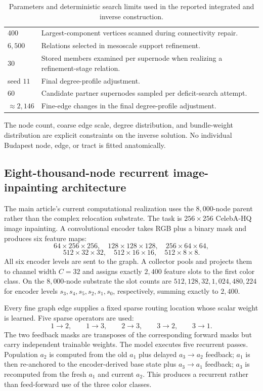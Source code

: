 \documentclass[12pt]{article}
\begin{document}
\begin{table}[H]
\begin{tabularx}{\textwidth}{p{}X}
400 & Largest-component vertices scanned during connectivity repair. \\
\(6{,}500\) & Relations selected in mesoscale support refinement. \\
30 & Stored members examined per supernode when realizing a refinement-stage relation. \\
seed \(11\) & Final degree-profile adjustment. \\
60 & Candidate partner supernodes sampled per deficit-search attempt. \\
\(\approx2{,}146\) & Fine-edge changes in the final degree-profile adjustment. \\
\bottomrule
\end{tabularx}
\caption{Parameters and deterministic search limits used in the reported integrated and inverse construction.}
\label{tab:reported-run-parameters}
\end{table}

The node count, coarse edge scale, degree distribution, and bundle-weight
distribution are explicit constraints on the inverse solution.  No individual
Budapest node, edge, or tract is fitted anatomically.

\subsection{Eight-thousand-node recurrent image-inpainting architecture}
\label{supp:eightk-inpainting}

The main article's current computational realization uses the $8{,}000$-node
parent rather than the complex relocation substrate. The task is
$256\times256$ CelebA-HQ image inpainting. A convolutional encoder takes RGB
plus a binary mask and produces six feature maps:
\[
64\times256\times256,
\quad
128\times128\times128,
\quad
256\times64\times64,
\]
\[
512\times32\times32,
\quad
512\times16\times16,
\quad
512\times8\times8.
\]
All six encoder levels are sent to the graph. A collector pools and projects
them to channel width $C=32$ and assigns exactly $2{,}400$ feature slots to
the first color class. On the $8{,}000$-node substrate the slot counts are
$512,128,32,1{,}024,480,224$ for encoder levels
$s_3,s_4,s_5,s_2,s_1,s_0$, respectively, summing exactly to $2{,}400$.

Every fine graph edge supplies a fixed sparse routing location whose scalar
weight is learned. Five sparse operators are used:
\[
1\to2,
\qquad
1\to3,
\qquad
2\to3,
\qquad
3\to2,
\qquad
3\to1.
\]
The two feedback masks are transposes of the corresponding forward masks but
carry independent trainable weights. The model executes five recurrent passes.
Population $a_2$ is computed from the old $a_1$ plus delayed $a_3\to a_2$
feedback; $a_1$ is then re-anchored to the encoder-derived base state plus
$a_3\to a_1$ feedback; $a_3$ is recomputed from the fresh $a_1$ and current
$a_2$. This produces a recurrent rather than feed-forward use of the three
color classes.
\end{document}
